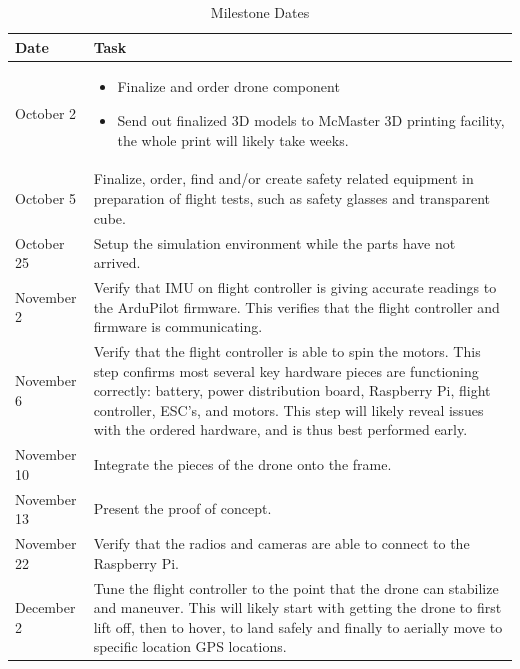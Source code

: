 \documentclass{article}
\begin{document}
\begin{table}[h]
\begin{center}
    

\caption {Milestone Dates} \label{tab:title}

\begin{tabular}{ | m{2cm} | m{11cm} | } 
\hline
Date & Task\\

\hline

October 2 &
\begin{itemize}
    \item Finalize and order drone component
    \item Send out finalized 3D models to McMaster 3D printing facility, the whole print will likely take weeks.
\end{itemize}   \\

\hline
October 5 & Finalize, order, find and/or create safety related equipment in preparation of flight tests, such as safety glasses and transparent cube.\\

\hline
October 25 & Setup the simulation environment while the parts have not arrived.\\
    
\hline
November 2 & Verify that IMU on flight controller is giving accurate readings to the ArduPilot firmware. This verifies that the flight controller and firmware is communicating.\\

\hline
November 6 & Verify that the flight controller is able to spin the motors. This step confirms most several key hardware pieces are functioning correctly: battery, power distribution board, Raspberry Pi, flight controller, ESC's, and motors. This step will likely reveal issues with the ordered hardware, and is thus best performed early. \\

\hline
November 10 & Integrate the pieces of the drone onto the frame. \\
\hline
November 13 & Present the proof of concept.\\

\hline
November 22 & Verify that the radios and cameras are able to connect to the Raspberry Pi.\\

\hline
December 2 & Tune the flight controller to the point that the drone can stabilize and maneuver. This will likely start with getting the drone to first lift off, then to hover, to land safely and finally to aerially move to specific location GPS locations. \\


\end{tabular}
\end{center}
\end{table}
\end{document}
